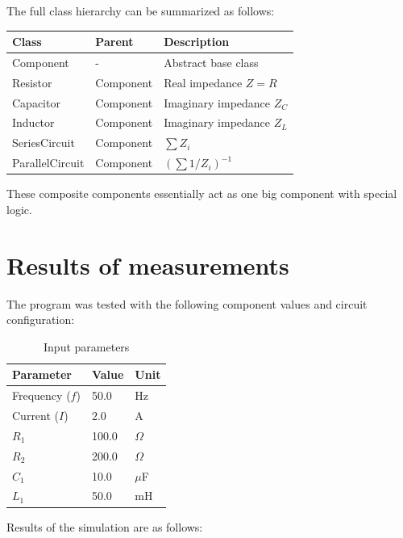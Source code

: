 \documentclass{article}
\begin{document}
    The full class hierarchy can be summarized as follows:

    \begin{center}
    \begin{tabular}{|l|l|l|}
        \hline
        \textbf{Class} & \textbf{Parent} & \textbf{Description} \\
        \hline
        Component & - & Abstract base class \\
        Resistor & Component & Real impedance $Z = R$ \\
        Capacitor & Component & Imaginary impedance $Z_C$ \\
        Inductor & Component & Imaginary impedance $Z_L$ \\
        SeriesCircuit & Component & $\sum Z_i$ \\
        ParallelCircuit & Component & $(\sum 1/Z_i)^{-1}$ \\
        \hline
    \end{tabular}
    \end{center}

    These composite components essentially act as one big component with special logic.

    \FloatBarrier
    \section{Results of measurements}
    The program was tested with the following component values and circuit configuration:

    \begin{table}[h]
        \centering
        \caption{Input parameters}
        \begin{tabular}{lll}
            \hline
            Parameter & Value & Unit \\
            \hline
            Frequency ($f$) & 50.0 & Hz \\
            Current ($I$) & 2.0 & A \\
            $R_1$ & 100.0 & $\Omega$ \\
            $R_2$ & 200.0 & $\Omega$ \\
            $C_1$ & 10.0 & $\mu$F \\
            $L_1$ & 50.0 & mH \\
            \hline
        \end{tabular}
    \end{table}

    Results of the simulation are as follows:
\end{document}
